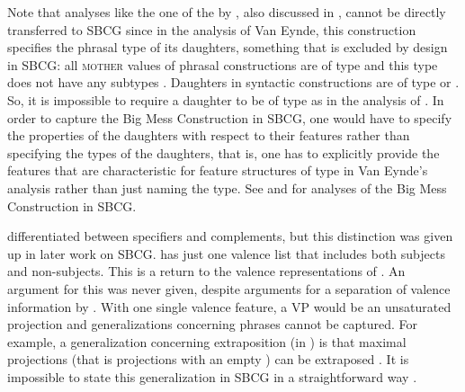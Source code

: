 \documentclass[output=paper,biblatex,babelshorthands,newtxmath,draftmode,colorlinks,citecolor=brown]{langscibook}
\begin{document}
Note that analyses like the one of the  by \citet[]{VanEynde2018a-u}, also discussed in \crossrefchapterw[\page \pageref{bigmess2}]{np}, cannot be
directly transferred to SBCG since in the analysis of Van Eynde, this construction specifies the
phrasal type of its daughters, something that is excluded by design in SBCG: all \textsc{mother} values of
phrasal constructions are of type  and this type does not have any subtypes
\citep[]{Sag2012a}. Daughters in syntactic constructions are of type  or
. So, it is impossible to require a daughter to be of type
 as in the analysis of \citeauthor{VanEynde2018a-u}. In order to
capture the Big Mess Construction in SBCG, one would have to specify the properties of the daughters
with respect to their features rather than specifying the types of the daughters, that is, one has
to explicitly provide the features that are characteristic for feature structures of type
 in Van Eynde's analysis rather than just naming the type. See
\citet{KS2012a-u} and \citet{KS2011a-u} for analyses of the Big Mess Construction in SBCG.


\citet*{SWB2003a} differentiated between specifiers and complements, but this distinction was given up
in later work on SBCG. \citet{Sag2012a} has just one valence list that includes both subjects and
non-subjects. This is a return to the valence representations of \citet{ps}. An argument for this
was never given, despite arguments for a separation of valence information by \citet{Borsley87a}. With one single valence feature, a VP would be an unsaturated projection and generalizations
concerning phrases cannot be captured. For example, a generalization concerning extraposition (in
) is that maximal projections (that is projections with an empty \compsl) can be
extraposed \citep[Section~13.1.2]{Mueller99a}. It is impossible to state this generalization in SBCG
in a straightforward way \citep[Section~10.6.2.3]{MuellerGT-Eng2}.

\end{document}
